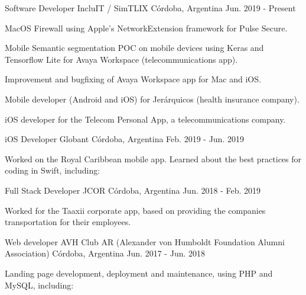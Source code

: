 \documentclass[10pt, a4paper]{resume}
\begin{document}
\begin{cventries}

  \cventry
    {Software Developer}
    {IncluIT / SimTLIX}
    {Córdoba, Argentina}
    {Jun. 2019 - Present}
    {
      \begin{cvitems}
      \item {MacOS Firewall using Apple's NetworkExtension framework for Pulse Secure.}
      \item {Mobile Semantic segmentation POC on mobile devices using Keras and Tensorflow Lite for Avaya Workspace (telecommunications app).}
	\item {Improvement and bugfixing of Avaya Workspace app for Mac and iOS.}
        \item {Mobile developer (Android and iOS) for Jerárquicos (health insurance company).}
	\item {iOS developer for the Telecom Personal App, a telecommunications company.}
      \end{cvitems}
    }

  \cventry
    {iOS Developer}
    {Globant}
    {Córdoba, Argentina}
    {Feb. 2019 - Jun. 2019}
    {
      \begin{cvitems}
        \item {Worked on the Royal Caribbean mobile app. Learned about the best practices for coding in Swift, including: \newline
            }
      \end{cvitems}
    }

  \cventry
    {Full Stack Developer}
    {JCOR}
    {Córdoba, Argentina}
    {Jun. 2018 - Feb. 2019}
    {
      \begin{cvitems}
        \item {Worked for the Taaxii corporate app, based on providing the companies transportation for their employees.  \newline
        }
      \end{cvitems}
    }

  \cventry
    {Web developer}
    {AVH Club AR (Alexander von Humboldt Foundation Alumni Association)}
    {Córdoba, Argentina}
    {Jun. 2017 - Jun. 2018}
    {
      \begin{cvitems}
        \item {Landing page development, deployment and maintenance, using PHP and MySQL, including: \newline
            }
      \end{cvitems}
    }

\end{cventries}
\end{document}
